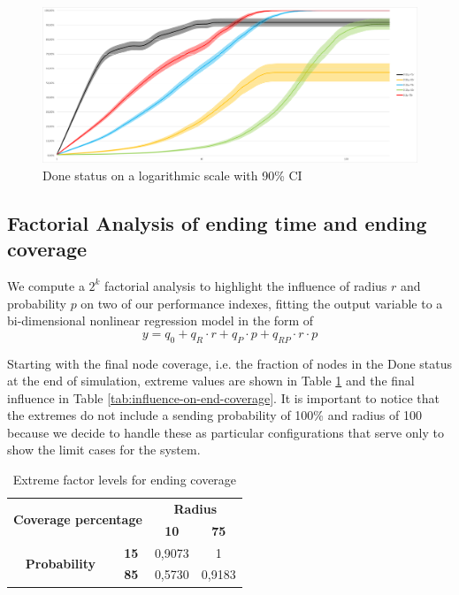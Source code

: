\begin{figure}[H]
\centering
    \includegraphics[width= 1\textwidth]{./images/temporalDoneLog.png}
    \caption{Done status on a logarithmic scale with 90\% CI}
    \label{fig:done-status-log}
\end{figure}

\subsection{Factorial Analysis of ending time and ending coverage}

We compute a $2^k$ factorial analysis to highlight the influence of radius $r$ and probability $p$ on two of our performance indexes, fitting the output variable to a bi-dimensional nonlinear regression model in the form of 
$$
y = q_0 + q_R \cdot r + q_P \cdot p + q_{RP} \cdot r \cdot p
$$

Starting with the final node coverage, i.e. the fraction of nodes in the Done status at the end of simulation, extreme values are shown in Table \ref{tab:extreme-factors-end-coverage} and the final influence in Table \ref{tab:influence-on-end-coverage}. It is important to notice that the extremes do not include a sending probability of 100\% and radius of 100 because we decide to handle these as particular configurations that serve only to show the limit cases for the system.


\begin{table}[h!]
\centering
\begin{tabular}{|cc|cc|}
\hline
\multicolumn{2}{|c|}{\multirow{2}{*}{\textbf{Coverage percentage}}} & \multicolumn{2}{c|}{\textbf{Radius}} \\ \cline{3-4} 
\multicolumn{2}{|c|}{} & \multicolumn{1}{c|}{\textbf{10}} & \textbf{75} \\ \hline
\multicolumn{1}{|c|}{\multirow{2}{*}{\textbf{Probability}}} & \textbf{15} & \multicolumn{1}{c|}{0,9073} & 1 \\ \cline{2-4} 
\multicolumn{1}{|c|}{} & \textbf{85} & \multicolumn{1}{c|}{0,5730} & 0,9183 \\ \hline
\end{tabular}
\caption{Extreme factor levels for ending coverage}
\label{tab:extreme-factors-end-coverage}
\end{table}

